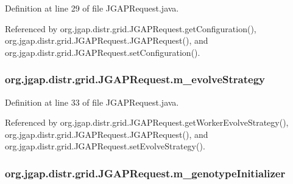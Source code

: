 Definition at line 29 of file J\-G\-A\-P\-Request.\-java.



Referenced by org.\-jgap.\-distr.\-grid.\-J\-G\-A\-P\-Request.\-get\-Configuration(), org.\-jgap.\-distr.\-grid.\-J\-G\-A\-P\-Request.\-J\-G\-A\-P\-Request(), and org.\-jgap.\-distr.\-grid.\-J\-G\-A\-P\-Request.\-set\-Configuration().

\hypertarget{classorg_1_1jgap_1_1distr_1_1grid_1_1_j_g_a_p_request_a68195390050789cad789fd7bec62fd65}{
\subsubsection[{m\-\_\-evolve\-Strategy}]{ org.\-jgap.\-distr.\-grid.\-J\-G\-A\-P\-Request.\-m\-\_\-evolve\-Strategy\hspace{0.3cm}{\ttfamily [private]}}}\label{classorg_1_1jgap_1_1distr_1_1grid_1_1_j_g_a_p_request_a68195390050789cad789fd7bec62fd65}


Definition at line 33 of file J\-G\-A\-P\-Request.\-java.



Referenced by org.\-jgap.\-distr.\-grid.\-J\-G\-A\-P\-Request.\-get\-Worker\-Evolve\-Strategy(), org.\-jgap.\-distr.\-grid.\-J\-G\-A\-P\-Request.\-J\-G\-A\-P\-Request(), and org.\-jgap.\-distr.\-grid.\-J\-G\-A\-P\-Request.\-set\-Evolve\-Strategy().

\hypertarget{classorg_1_1jgap_1_1distr_1_1grid_1_1_j_g_a_p_request_aad27c31fee71d6853c55459f1875b3e3}{
\subsubsection[{m\-\_\-genotype\-Initializer}]{ org.\-jgap.\-distr.\-grid.\-J\-G\-A\-P\-Request.\-m\-\_\-genotype\-Initializer\hspace{0.3cm}{\ttfamily [private]}}}\label{classorg_1_1jgap_1_1distr_1_1grid_1_1_j_g_a_p_request_aad27c31fee71d6853c55459f1875b3e3}



